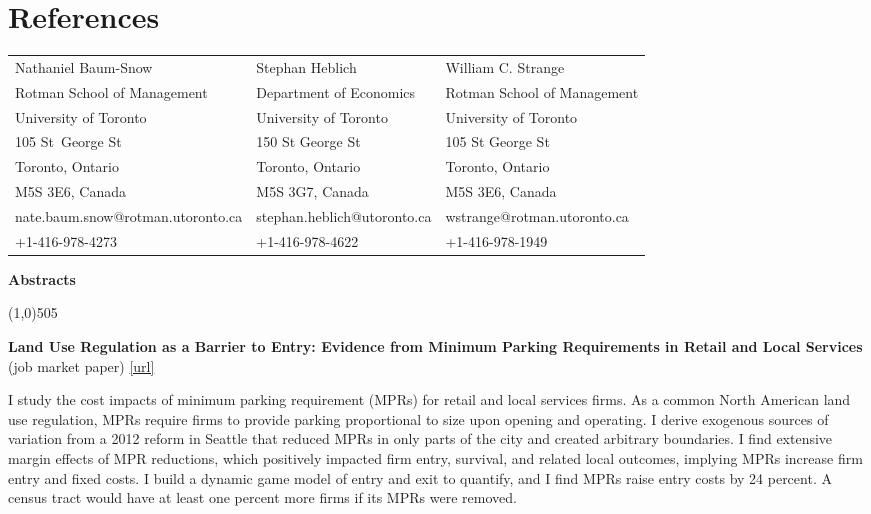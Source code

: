 \documentclass[11pt, a4paper]{article}
\begin{document}
{\section*{References}
\noindent\begin{tabular}{@{}lll}
Nathaniel Baum-Snow                 &  Stephan Heblich & William C. Strange           \\
Rotman School of Management   &  Department of Economics & Rotman School of Management  \\
University of Toronto     &  University of Toronto  & University of Toronto  \\
105 St\ George St        & 150 St George St & 105 St George St       \\
Toronto, Ontario          & Toronto, Ontario  & Toronto, Ontario        \\
 M5S 3E6, Canada           & M5S 3G7, Canada  & M5S 3E6, Canada          \\
nate.baum.snow@rotman.utoronto.ca      & stephan.heblich@utoronto.ca & wstrange@rotman.utoronto.ca\\
+1-416-978-4273           & +1-416-978-4622   & +1-416-978-1949        \\\end{tabular}

\newpage
\begin{center}
\LARGE
\textbf{Abstracts}
\normalsize
\end{center}
\line(1,0){505}

\begin{center}
\LARGE
\textbf{Land Use Regulation as a Barrier to Entry: Evidence from Minimum Parking Requirements in Retail and Local Services}\\
\large
(job market paper) \href{https://www.dropbox.com/scl/fi/6s49411cit1tgsrnsmwhh/YangJunhui_JobMarketPaper_202411.pdf?rlkey=od6mfnloa6fo6zvjmzc3e7etu&st=eo4ixm4y&dl=0}{[url]}
\normalsize
\end{center}

I study the cost impacts of minimum parking requirement (MPRs) for retail and local services firms. As a common North American land use regulation, MPRs require firms to provide parking proportional to size upon opening and operating. I derive exogenous sources of variation from a 2012 reform in Seattle that reduced MPRs in only parts of the city and created arbitrary boundaries. I find extensive margin effects of MPR reductions, which positively impacted firm entry, survival, and related local outcomes, implying MPRs increase firm entry and fixed costs. I build a dynamic game model of entry and exit to quantify, and I find MPRs raise entry costs by 24 percent. A census tract would have at least one percent more firms if its MPRs were removed. \\

}
\end{document}
